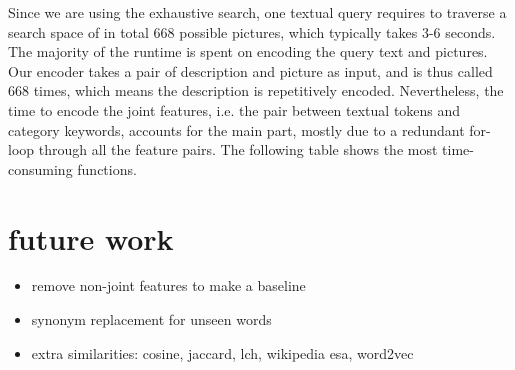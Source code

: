 \documentclass{article} %
\begin{document}
Since we are using the exhaustive search, one textual query requires to traverse a search space of in total 668 possible pictures, which typically takes 3-6 seconds. The majority of the runtime is spent on encoding the query text and pictures. Our encoder takes a pair of description and picture as input, and is thus called 668 times, which means the description is repetitively encoded. Nevertheless, the time to encode the joint features, i.e. the pair between textual tokens and category keywords, accounts for the main part, mostly due to a redundant for-loop through all the feature pairs. The following table shows the most time-consuming functions.


\section{future work}
\begin{itemize}
	\item remove non-joint features to make a baseline
	\item synonym replacement for unseen words
	\item extra similarities: cosine, jaccard, lch, wikipedia esa, word2vec
\end{itemize}


\end{document}
